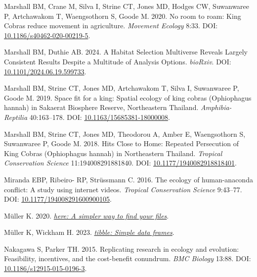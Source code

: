 \documentclass[10pt,a4paper]{article}
\newlength{\cslhangindent}
\newenvironment{CSLReferences}[2] %
 {\begin{list}{}{%
  \setlength{\itemindent}{0pt}
  \setlength{\leftmargin}{0pt}
  \setlength{\parsep}{0pt}
  \ifodd #1
   \setlength{\leftmargin}{\cslhangindent}
   \setlength{\itemindent}{-1\cslhangindent}
  \fi
  \setlength{\itemsep}{#2\baselineskip}}}
 {\end{list}}
\begin{document}
\begin{CSLReferences}{1}{0}
Marshall BM, Crane M, Silva I, Strine CT, Jones MD, Hodges CW, Suwanwaree P, Artchawakom T, Waengsothorn S, Goode M. 2020. No room to roam: {King} {Cobras} reduce movement in agriculture. \emph{Movement Ecology} 8:33. DOI: \href{https://doi.org/10.1186/s40462-020-00219-5}{10.1186/s40462-020-00219-5}.

Marshall BM, Duthie AB. 2024. A {Habitat} {Selection} {Multiverse} {Reveals} {Largely} {Consistent} {Results} {Despite} a {Multitude} of {Analysis} {Options}. \emph{bioRxiv}. DOI: \href{https://doi.org/10.1101/2024.06.19.599733}{10.1101/2024.06.19.599733}.

Marshall BM, Strine CT, Jones MD, Artchawakom T, Silva I, Suwanwaree P, Goode M. 2019. Space fit for a king: Spatial ecology of king cobras ({Ophiophagus} hannah) in {Sakaerat} {Biosphere} {Reserve}, {Northeastern} {Thailand}. \emph{Amphibia-Reptilia} 40:163--178. DOI: \href{https://doi.org/10.1163/15685381-18000008}{10.1163/15685381-18000008}.

Marshall BM, Strine CT, Jones MD, Theodorou A, Amber E, Waengsothorn S, Suwanwaree P, Goode M. 2018. Hits {Close} to {Home}: {Repeated} {Persecution} of {King} {Cobras} ({Ophiophagus} hannah) in {Northeastern} {Thailand}. \emph{Tropical Conservation Science} 11:194008291881840. DOI: \href{https://doi.org/10.1177/1940082918818401}{10.1177/1940082918818401}.

Miranda EBP, Ribeiro- RP, Strüssmann C. 2016. The ecology of human-anaconda conflict: A study using internet videos. \emph{Tropical Conservation Science} 9:43--77. DOI: \href{https://doi.org/10.1177/194008291600900105}{10.1177/194008291600900105}.

Müller K. 2020. \emph{\href{https://CRAN.R-project.org/package=here}{{here}: A simpler way to find your files}}.

Müller K, Wickham H. 2023. \emph{\href{https://CRAN.R-project.org/package=tibble}{{tibble}: Simple data frames}}.

Nakagawa S, Parker TH. 2015. Replicating research in ecology and evolution: Feasibility, incentives, and the cost-benefit conundrum. \emph{BMC Biology} 13:88. DOI: \href{https://doi.org/10.1186/s12915-015-0196-3}{10.1186/s12915-015-0196-3}.


\end{CSLReferences}
\end{document}
